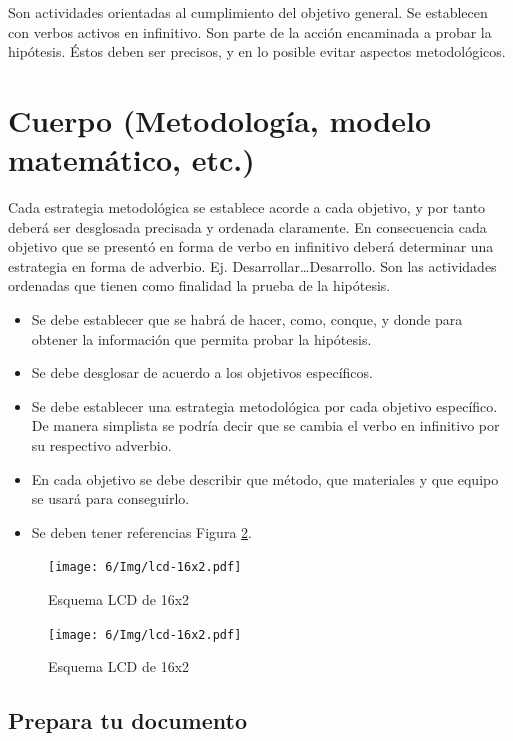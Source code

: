     Son actividades orientadas al cumplimiento del objetivo general. Se establecen con verbos activos en infinitivo. Son parte de la acción encaminada a probar la hipótesis. Éstos deben ser precisos, y en lo posible evitar aspectos metodológicos.
    \section{Cuerpo (Metodología, modelo matemático, etc.)}
    
    Cada estrategia metodológica se establece acorde a cada objetivo, y por tanto deberá ser desglosada precisada y ordenada claramente. En consecuencia cada objetivo que se presentó en forma de verbo en infinitivo deberá determinar una estrategia en forma de adverbio. Ej. Desarrollar…Desarrollo. Son las actividades ordenadas que tienen como finalidad la prueba de la hipótesis. 
    
    \begin{itemize}
        \item Se debe establecer que se habrá de hacer, como, conque, y donde para obtener la información que permita probar la hipótesis.  
        \item Se debe desglosar de acuerdo a los objetivos específicos. 
        \item Se debe establecer una estrategia metodológica por cada objetivo específico. De manera simplista se podría decir que se cambia el verbo en infinitivo por su respectivo adverbio.
        \item En cada objetivo se debe describir que método, que materiales y que equipo se usará para conseguirlo.
        \item Se deben tener referencias Figura \ref{fig:lcd-16x2}.
    \end{itemize}
    \begin{figure}[H]
        \centering
        \texttt{[image: 6/Img/lcd-16x2.pdf]}
        \caption{Esquema LCD de 16x2}
        \label{fig:lcd-16x2}
    \end{figure}
    \begin{figure}[H]
        \centering
        \texttt{[image: 6/Img/lcd-16x2.pdf]}
        \caption{Esquema LCD de 16x2}
        \label{fig:lcd-16x2}
    \end{figure}
    \subsection{Prepara tu documento}
    
